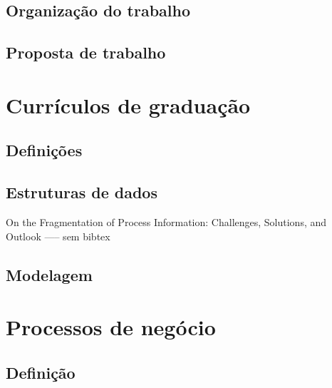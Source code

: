 \documentclass[a4paper]{article}
\begin{document}
\subsection{Organização do trabalho}

\lipsum[15]

\subsection{Proposta de trabalho}

\lipsum[14]
\lipsum[17]
\lipsum[80]

\section{Currículos de graduação}
\lipsum[10]
\lipsum[10]

\subsection{Definições}
\lipsum[10]
\lipsum[10]
\lipsum[10]
\lipsum[10]

\subsection{Estruturas de dados}

On the Fragmentation of Process Information: Challenges, Solutions, and Outlook ----- sem bibtex 
\lipsum[10]
\lipsum[10]
\lipsum[10]
\lipsum[10]
\lipsum[10]
\lipsum[10]
\lipsum[10]

\subsection{Modelagem}

\lipsum[10]
\lipsum[10]
\lipsum[10]
\lipsum[10]
\lipsum[10]
\lipsum[10]
\lipsum[10]

\section{Processos de negócio}

\cite{BPM_CBOK}
\lipsum[10]
\lipsum[10]
\lipsum[10]
\lipsum[10]
\lipsum[10]
\lipsum[10]

\subsection{Definição}
\end{document}
